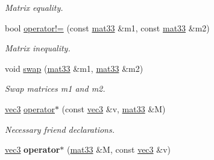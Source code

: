 \begin{DoxyCompactItemize}
\begin{DoxyCompactList}\small\item\em \-Matrix equality. \end{DoxyCompactList}\item 
\hypertarget{classutil_1_1math_1_1mat33_a9e9105591db331242273e057417ea669}{bool \hyperlink{classutil_1_1math_1_1mat33_a9e9105591db331242273e057417ea669}{operator!=} (const \hyperlink{classutil_1_1math_1_1mat33}{mat33} \&m1, const \hyperlink{classutil_1_1math_1_1mat33}{mat33} \&m2)}\label{classutil_1_1math_1_1mat33_a9e9105591db331242273e057417ea669}

\begin{DoxyCompactList}\small\item\em \-Matrix inequality. \end{DoxyCompactList}\item 
\hypertarget{classutil_1_1math_1_1mat33_aa5448a9c418f69b3c35a538663ceda17}{void \hyperlink{classutil_1_1math_1_1mat33_aa5448a9c418f69b3c35a538663ceda17}{swap} (\hyperlink{classutil_1_1math_1_1mat33}{mat33} \&m1, \hyperlink{classutil_1_1math_1_1mat33}{mat33} \&m2)}\label{classutil_1_1math_1_1mat33_aa5448a9c418f69b3c35a538663ceda17}

\begin{DoxyCompactList}\small\item\em \-Swap matrices m1 and m2. \end{DoxyCompactList}\end{DoxyCompactItemize}
{\bf }\par
\begin{DoxyCompactItemize}
\item 
\hypertarget{classutil_1_1math_1_1mat33_ac78a1894e9f2ea662209f72812e2a399}{\hyperlink{classutil_1_1math_1_1vec3}{vec3} \hyperlink{classutil_1_1math_1_1mat33_ac78a1894e9f2ea662209f72812e2a399}{operator$\ast$} (const \hyperlink{classutil_1_1math_1_1vec3}{vec3} \&v, \hyperlink{classutil_1_1math_1_1mat33}{mat33} \&\-M)}\label{classutil_1_1math_1_1mat33_ac78a1894e9f2ea662209f72812e2a399}

\begin{DoxyCompactList}\small\item\em \-Necessary friend declarations. \end{DoxyCompactList}\item 
\hypertarget{classutil_1_1math_1_1mat33_aa0f2b7eb53427e197a5cec77e5c0203a}{\hyperlink{classutil_1_1math_1_1vec3}{vec3} {\bfseries operator$\ast$} (\hyperlink{classutil_1_1math_1_1mat33}{mat33} \&\-M, const \hyperlink{classutil_1_1math_1_1vec3}{vec3} \&v)}\label{classutil_1_1math_1_1mat33_aa0f2b7eb53427e197a5cec77e5c0203a}

\end{DoxyCompactItemize}



